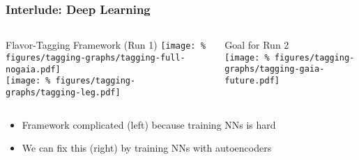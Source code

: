 \documentclass[usenames,dvipsnames]{beamer}
\begin{document}
\begin{frame}
  \frametitle{Interlude: Deep Learning}
  \begin{columns}
    \begin{column}{0.6\textwidth}
      \begin{center}
        Flavor-Tagging Framework (Run 1)
        \texttt{[image: \%
figures/tagging-graphs/tagging-full-nogaia.pdf]} \\
        \texttt{[image: \%
figures/tagging-graphs/tagging-leg.pdf]}
      \end{center}
    \end{column}
    \vline
    \begin{column}{0.4\textwidth}
      \begin{center}
        Goal for Run 2 \\[0.3cm]
        \texttt{[image: \%
figures/tagging-graphs/tagging-gaia-future.pdf]}
      \end{center}
    \end{column}
  \end{columns}
  \begin{itemize}
  \item Framework complicated (left) because training NNs is hard
  \item We can fix this (right) by training NNs with autoencoders
  \end{itemize}
\end{frame}

\end{document}
